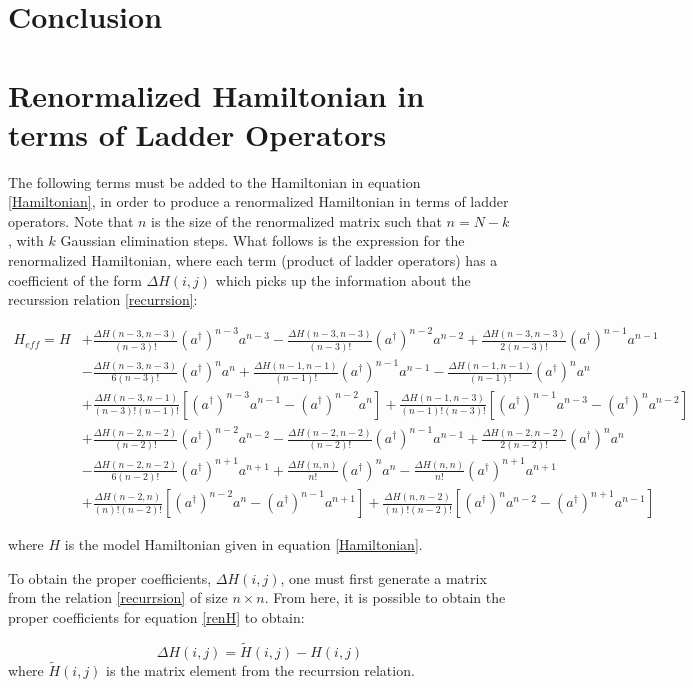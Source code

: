 \documentclass[%
 reprint,
nofootinbib,
 amsmath,amssymb,
 aps,
]{revtex4-2}
\numberwithin{equation}{section}
\begin{document}
\section{Conclusion}



\appendix
\section{Renormalized Hamiltonian in terms of Ladder Operators}
The following terms must be added to the Hamiltonian in equation \ref{Hamiltonian}, in order to produce a renormalized Hamiltonian in terms of ladder operators. Note that $n$ is the size of the renormalized matrix such that $n = N - k$, with $k$ Gaussian elimination steps.
What follows is the expression for the renormalized Hamiltonian, where each term (product of ladder operators) has a coefficient of the form $\Delta H(i,j)$ which picks up the information about the recurssion relation \ref{recurrsion}:

\begin{widetext}
\begin{align}
  \label{renH}
  H_{eff} = H &+ \frac{\Delta H(n-3, n-3)}{(n-3)!}(a^\dagger)^{n-3}a^{n-3} - \frac{\Delta H(n-3, n-3)}{(n-3)!}(a^\dagger)^{n-2}a^{n-2} + \frac{\Delta H(n-3, n-3)}{2(n-3)!}(a^\dagger)^{n-1}a^{n-1}\\ \nonumber
             &- \frac{\Delta H(n-3, n-3)}{6(n-3)!}(a^\dagger)^{n}a^{n} +  \frac{\Delta H(n-1, n-1)}{(n-1)!}(a^\dagger)^{n - 1}a^{n - 1} - \frac{\Delta H(n-1, n-1)}{(n-1)!}(a^\dagger)^{n}a^{n}\\ \nonumber
             &+ \frac{\Delta H(n-3, n-1)}{(n-3)!(n-1)!}\left[(a^\dagger)^{n-3}a^{n-1} - (a^\dagger)^{n-2}a^{n} \right]+ \frac{\Delta H(n-1, n-3)}{(n-1)!(n-3)!}\left[(a^\dagger)^{n-1}a^{n-3} - (a^\dagger)^{n}a^{n-2} \right] \\ \nonumber
             &+ \frac{\Delta H(n-2, n-2)}{(n-2)!}(a^\dagger)^{n-2}a^{n-2} - \frac{\Delta H(n-2, n-2)}{(n-2)!}(a^\dagger)^{n-1}a^{n-1} + \frac{\Delta H(n-2, n-2)}{2(n-2)!}(a^\dagger)^{n}a^{n} \\ \nonumber
             &-\frac{\Delta H(n-2, n-2)}{6(n-2)!}(a^\dagger)^{n+1}a^{n+1} + \frac{\Delta H(n, n)}{n!}(a^\dagger)^n a^n -\frac{\Delta H(n, n)}{n!}(a^\dagger)^{n + 1} a^{n + 1} \\ \nonumber
             &+ \frac{\Delta H(n-2, n)}{(n)!(n-2)!}\left[(a^\dagger)^{n-2}a^{n} - (a^\dagger)^{n-1}a^{n+1} \right]+ \frac{\Delta H(n, n-2)}{(n)!(n-2)!}\left[(a^\dagger)^{n}a^{n-2} - (a^\dagger)^{n+1}a^{n-1} \right]
\end{align}
\end{widetext}
where $H$ is the model Hamiltonian given in equation \ref{Hamiltonian}.

To obtain the proper coefficients, $\Delta H(i,j)$, one must first generate a matrix from the relation \ref{recurrsion} of size $n \times n$. From here, it is possible to obtain the proper coefficients for equation \ref{renH} to obtain:

\begin{equation}
  \Delta H(i, j) = \tilde{H}(i,j) - H(i,j)
\end{equation}
where $\tilde{H}(i,j)$ is the matrix element from the recurrsion relation.
\end{document}
